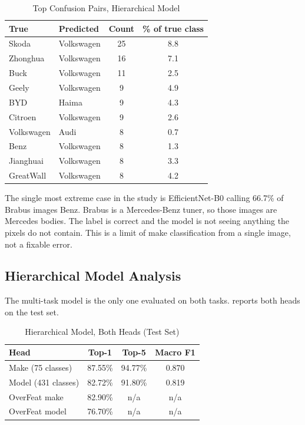 \begin{table}[ht]
\centering
\caption{Top Confusion Pairs, Hierarchical Model}
\label{tab:confusions}
\begin{tabular}{llcc}
\toprule
\textbf{True} & \textbf{Predicted} & \textbf{Count} & \textbf{\% of true class} \\
\midrule
Skoda & Volkswagen & 25 & 8.8 \\
Zhonghua & Volkswagen & 16 & 7.1 \\
Buck & Volkswagen & 11 & 2.5 \\
Geely & Volkswagen & 9 & 4.9 \\
BYD & Haima & 9 & 4.3 \\
Citroen & Volkswagen & 9 & 2.6 \\
Volkswagen & Audi & 8 & 0.7 \\
Benz & Volkswagen & 8 & 1.3 \\
Jianghuai & Volkswagen & 8 & 3.3 \\
GreatWall & Volkswagen & 8 & 4.2 \\
\bottomrule
\end{tabular}
\end{table}

The single most extreme case in the study is EfficientNet-B0 calling 66.7\% of Brabus images Benz. Brabus is a Mercedes-Benz tuner, so those images are Mercedes bodies. The label is correct and the model is not seeing anything the pixels do not contain. This is a limit of make classification from a single image, not a fixable error.

\subsection{Hierarchical Model Analysis}

The multi-task model is the only one evaluated on both tasks.  reports both heads on the test set.

\begin{table}[ht]
\centering
\caption{Hierarchical Model, Both Heads (Test Set)}
\label{tab:hier}
\begin{tabular}{lccc}
\toprule
\textbf{Head} & \textbf{Top-1} & \textbf{Top-5} & \textbf{Macro F1} \\
\midrule
Make (75 classes) & 87.55\% & 94.77\% & 0.870 \\
Model (431 classes) & 82.72\% & 91.80\% & 0.819 \\
\midrule
OverFeat make~\cite{Yang2015} & 82.90\% & n/a & n/a \\
OverFeat model~\cite{Yang2015} & 76.70\% & n/a & n/a \\
\bottomrule
\end{tabular}
\end{table}

